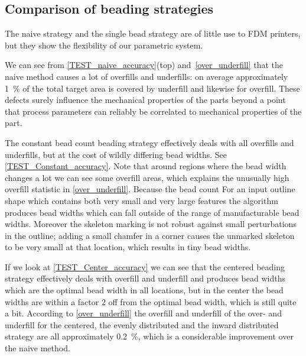 


\subsection{Comparison of beading strategies}
The naive strategy and the single bead strategy are of little use to FDM printers, but they show the flexibility of our parametric system.

We can see from \cref{TEST_naive_accuracy}(top) and~\ref{over_underfill} that the naive method causes a lot of overfills and underfills: on average approximately \SI{1}{\percent} of the total target area is covered by underfill and likewise for overfill.
These defects surely influence the mechanical properties of the parts beyond a point that process parameters can reliably be correlated to mechanical properties of the part.


The constant bead count beading strategy effectively deals with all overfills and underfills, but at the cost of wildly differing bead widths.
See \cref{TEST_Constant_accuracy}.
Note that around regions where the bead width changes a lot we can see some overfill areas, which explains the unusually high overfill statistic in \cref{over_underfill}.
Because the bead count 
For an input outline shape which contains both very small and very large features the algorithm produces bead widths which can fall outside of the range of manufacturable bead widths.
Moreover the skeleton marking is not robust against small perturbations in the outline; adding a small chamfer in a corner causes the unmarked skeleton to be very small at that location, which results in tiny bead widths.

If we look at \cref{TEST_Center_accuracy} we can see that
the centered beading strategy effectively deals with overfill and underfill and produces bead widths which are the optimal bead width in all locations, but in the center the bead widths are within a factor 2 off from the optimal bead width, which is still quite a bit.
According to \cref{over_underfill} the overfill and underfill of the over- and underfill for the centered, the evenly distributed and the inward distributed strategy are all approximately \SI{0.2}{\percent}, which is a considerable improvement over the naive method.

